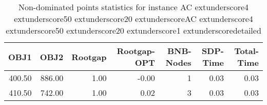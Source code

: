 \begin{table}
\caption{Non-dominated points statistics for instance AC	extunderscore4	extunderscore50	extunderscore20	extunderscoreAC	extunderscore4	extunderscore50	extunderscore20	extunderscore1	extunderscoredetailed}
\label{tab:stats/AC_4_50_20_AC_4_50_20_1_detailed}
\begin{tabular}{rrrrrrr}
\toprule
OBJ1 & OBJ2 & Rootgap & Rootgap-OPT & BNB-Nodes & SDP-Time & Total-Time \\
\midrule
400.50 & 886.00 & 1.00 & -0.00 & 1 & 0.03 & 0.03 \\
410.50 & 742.00 & 1.00 & 0.02 & 3 & 0.03 & 0.03 \\
\bottomrule
\end{tabular}
\end{table}

